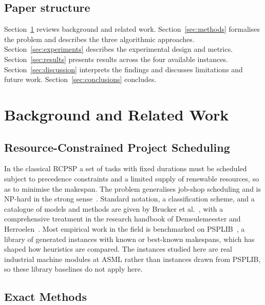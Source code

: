 \documentclass[conference]{IEEEtran}
\begin{document}
\subsection{Paper structure}

Section~\ref{sec:related} reviews background and related work.
Section~\ref{sec:methods} formalises the problem and describes the
three algorithmic approaches. Section~\ref{sec:experiments} describes
the experimental design and metrics. Section~\ref{sec:results}
presents results across the four available instances.
Section~\ref{sec:discussion} interprets the findings and discusses
limitations and future work. Section~\ref{sec:conclusions} concludes.

\section{Background and Related Work}
\label{sec:related}

\subsection{Resource-Constrained Project Scheduling}

In the classical RCPSP a set of tasks with fixed durations must be
scheduled subject to precedence constraints and a limited supply of
renewable resources, so as to minimise the makespan. The problem
generalises job-shop scheduling and is NP-hard in the strong
sense~\cite{blazewicz1983scheduling}. Standard notation, a
classification scheme, and a catalogue of models and methods are given
by Brucker et al.~\cite{brucker1999rcpsp}, with a comprehensive treatment
in the research handbook of Demeulemeester and
Herroelen~\cite{demeulemeester2002project}. Most empirical work in the
field is benchmarked on PSPLIB~\cite{kolisch1997psplib}, a library of
generated instances with known or best-known makespans, which has
shaped how heuristics are compared. The instances studied here are real
industrial machine modules at ASML rather than instances drawn from
PSPLIB, so these library baselines do not apply here.

\subsection{Exact Methods}
\end{document}
